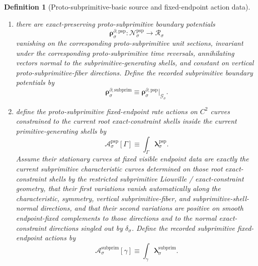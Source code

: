 \documentclass[11pt]{article}
\newcommand{\DensityClass}[1]{\mathscr N_{#1}}
\newcommand{\FluxClass}[1]{\mathscr J_{#1}}
\newcommand{\PhaseReadClass}[1]{\mathscr R_{#1}}
\newcommand{\ConstraintGap}[1]{\delta_{#1}}
\newcommand{\SubprimSpace}[1]{\mathcal G_{#1}}
\newcommand{\SubprimRateForm}[1]{\boldsymbol{\lambda}_{#1}^{\mathrm{subprim}}}
\newcommand{\SubprimDensitySource}[1]{\boldsymbol{q}_{#1}^{\mathrm{subprim}}}
\newcommand{\SubprimFluxSource}[1]{\boldsymbol{j}_{#1}^{\mathrm{subprim}}}
\newcommand{\SubprimBoundarySource}[1]{\boldsymbol{\rho}_{#1}^{\partial,\mathrm{subprim}}}
\newcommand{\SubprimAction}[1]{\mathscr A_{#1}^{\mathrm{subprim}}}
\newcommand{\ProtoSubprimSpace}[1]{\mathcal N_{#1}^{\mathrm{psp}}}
\newcommand{\ProtoSubprimRateForm}[1]{\boldsymbol{\lambda}_{#1}^{\mathrm{psp}}}
\newcommand{\ProtoSubprimDensitySource}[1]{\boldsymbol{q}_{#1}^{\mathrm{psp}}}
\newcommand{\ProtoSubprimFluxSource}[1]{\boldsymbol{j}_{#1}^{\mathrm{psp}}}
\newcommand{\ProtoSubprimBoundarySource}[1]{\boldsymbol{\rho}_{#1}^{\partial,\mathrm{psp}}}
\newcommand{\ProtoSubprimAction}[1]{\mathscr A_{#1}^{\mathrm{psp}}}
\newtheorem{definition}{Definition}
\begin{document}
\begin{definition}[Proto-subprimitive-basic source and fixed-endpoint action data]
\begin{enumerate}
    \[
    \ProtoSubprimDensitySource{\sigma}:\ProtoSubprimSpace{\sigma}\to\DensityClass{\sigma},
    \qquad
    \ProtoSubprimFluxSource{\sigma}:\ProtoSubprimSpace{\sigma}\to\FluxClass{\sigma},
    \]
    invariant under the corresponding proto-subprimitive time reversals, preserved along the current subprimitive characteristic curves, and constant on subprimitive-shell-normal directions and on vertical proto-subprimitive-fiber directions. Define the recorded subprimitive density and subprimitive flux source fields by restriction:
    \begin{equation}
    \SubprimDensitySource{\sigma}\equiv \ProtoSubprimDensitySource{\sigma}|_{\SubprimSpace{\sigma}},
    \qquad
    \SubprimFluxSource{\sigma}\equiv \ProtoSubprimFluxSource{\sigma}|_{\SubprimSpace{\sigma}}.
    \label{eq:subprimitive_sources_from_protosubprimitive}
    \end{equation}
    \item there are exact-preserving proto-subprimitive boundary potentials
    \[
    \ProtoSubprimBoundarySource{\sigma}:\ProtoSubprimSpace{\sigma}\to\PhaseReadClass{\sigma}
    \]
    vanishing on the corresponding proto-subprimitive unit sections, invariant under the corresponding proto-subprimitive time reversals, annihilating vectors normal to the subprimitive-generating shells, and constant on vertical proto-subprimitive-fiber directions. Define the recorded subprimitive boundary potentials by
    \begin{equation}
    \SubprimBoundarySource{\sigma}\equiv \ProtoSubprimBoundarySource{\sigma}|_{\SubprimSpace{\sigma}}.
    \label{eq:subprimitive_boundary_from_protosubprimitive}
    \end{equation}
    \item define the proto-subprimitive fixed-endpoint rate actions on \(C^2\) curves constrained to the current root exact-constraint shells inside the current primitive-generating shells by
    \begin{equation}
    \ProtoSubprimAction{\sigma}[\Gamma]\equiv \int_\Gamma \ProtoSubprimRateForm{\sigma}.
    \label{eq:protosubprimitive_action}
    \end{equation}
    Assume their stationary curves at fixed visible endpoint data are exactly the current subprimitive characteristic curves determined on those root exact-constraint shells by the restricted subprimitive Liouville / exact-constraint geometry, that their first variations vanish automatically along the characteristic, symmetry, vertical subprimitive-fiber, and subprimitive-shell-normal directions, and that their second variations are positive on smooth endpoint-fixed complements to those directions and to the normal exact-constraint directions singled out by \(\ConstraintGap{\sigma}\). Define the recorded subprimitive fixed-endpoint actions by
    \begin{equation}
    \SubprimAction{\sigma}[\gamma]\equiv \int_\gamma \SubprimRateForm{\sigma}.
    \label{eq:subprimitive_action_from_protosubprimitive}
    \end{equation}
\end{enumerate}
\end{definition}
\end{document}
